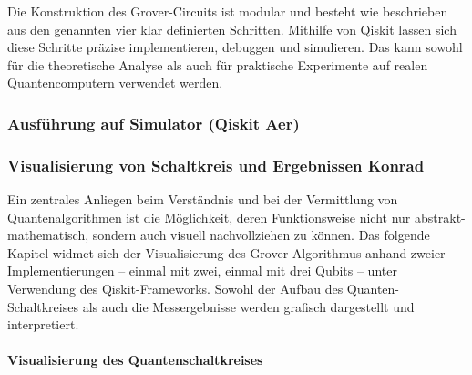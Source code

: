 Die Konstruktion des Grover-Circuits ist modular und besteht wie beschrieben aus den genannten vier klar definierten Schritten. Mithilfe von Qiskit lassen sich diese Schritte präzise implementieren, debuggen und simulieren. Das kann sowohl für die theoretische Analyse als auch für praktische Experimente auf realen Quantencomputern verwendet werden.

\subsubsection{Ausführung auf Simulator (Qiskit Aer)}
\subsubsection{Visualisierung von Schaltkreis und Ergebnissen Konrad}

\setlength{\parindent}{0pt} %
\setlength{\parskip}{1em}   %

Ein zentrales Anliegen beim Verständnis und bei der Vermittlung von Quantenalgorithmen ist die Möglichkeit, deren Funktionsweise nicht nur abstrakt-mathematisch, sondern auch visuell nachvollziehen zu können. Das folgende Kapitel widmet sich der Visualisierung des Grover-Algorithmus anhand zweier Implementierungen – einmal mit zwei, einmal mit drei Qubits – unter Verwendung des Qiskit-Frameworks. Sowohl der Aufbau des Quanten-Schaltkreises als auch die Messergebnisse werden grafisch dargestellt und interpretiert.

\paragraph*{Visualisierung des Quantenschaltkreises}
\mbox{}


